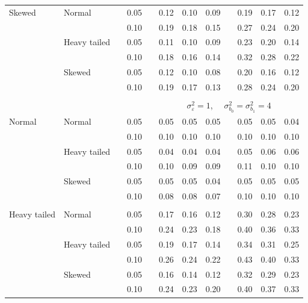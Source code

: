 \documentclass[12pt]{article} %
\begin{document}
\begin{table}[ht]
\begin{scriptsize}
\begin{center}
\begin{tabular}{ll p{.1cm} c p{.1cm} rrr p{.1cm} rrr}
Skewed       & Normal       && 0.05 &&  0.12 & 0.10 & 0.09 && 0.19 & 0.17 & 0.12 \\ 
             &              && 0.10 &&  0.19 & 0.18 & 0.15 && 0.27 & 0.24 & 0.20 \\ 
             & Heavy tailed && 0.05 &&  0.11 & 0.10 & 0.09 && 0.23 & 0.20 & 0.14 \\ 
             &              && 0.10 &&  0.18 & 0.16 & 0.14 && 0.32 & 0.28 & 0.22 \\ 
             & Skewed       && 0.05 &&  0.12 & 0.10 & 0.08 && 0.20 & 0.16 & 0.12 \\ 
             &              && 0.10 &&  0.19 & 0.17 & 0.13 && 0.28 & 0.24 & 0.20 \\ 


&&&&&&&&&&&\\
& && && \multicolumn{7}{c}{$\sigma_{\varepsilon}^2 = 1$, \ \ $\sigma_{b_0}^2 = \sigma_{b_1}^2 = 4$} \\ \cline{6-12}
\rowcolor{gray!20}Normal       & Normal       && 0.05 &&  0.05 & 0.05 & 0.05 && 0.05 & 0.05 & 0.04 \\ 
\rowcolor{gray!20}             &              && 0.10 &&  0.10 & 0.10 & 0.10 && 0.10 & 0.10 & 0.10 \\ 
\rowcolor{gray!20}             & Heavy tailed && 0.05 &&  0.04 & 0.04 & 0.04 && 0.05 & 0.06 & 0.06 \\ 
\rowcolor{gray!20}             &              && 0.10 &&  0.10 & 0.09 & 0.09 && 0.11 & 0.10 & 0.10 \\ 
\rowcolor{gray!20}             & Skewed       && 0.05 &&  0.05 & 0.05 & 0.04 && 0.05 & 0.05 & 0.05 \\ 
\rowcolor{gray!20}             &              && 0.10 &&  0.08 & 0.08 & 0.07 && 0.10 & 0.10 & 0.10 \\ 
             &&&&&&&&&&&\\
Heavy tailed & Normal       && 0.05 &&  0.17 & 0.16 & 0.12 && 0.30 & 0.28 & 0.23 \\ 
             &              && 0.10 &&  0.24 & 0.23 & 0.18 && 0.40 & 0.36 & 0.33 \\ 
             & Heavy tailed && 0.05 &&  0.19 & 0.17 & 0.14 && 0.34 & 0.31 & 0.25 \\ 
             &              && 0.10 &&  0.26 & 0.24 & 0.22 && 0.43 & 0.40 & 0.33 \\ 
             & Skewed       && 0.05 &&  0.16 & 0.14 & 0.12 && 0.32 & 0.29 & 0.23 \\ 
             &              && 0.10 &&  0.24 & 0.23 & 0.20 && 0.40 & 0.37 & 0.33 \\ 

\end{tabular}
\end{center}
\end{scriptsize}
\end{table}
\end{document}
